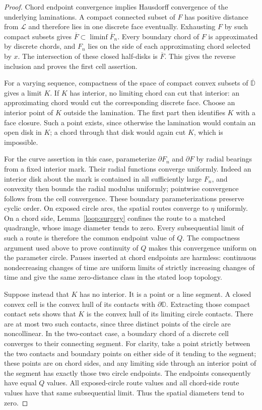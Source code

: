 \documentclass[11pt]{article}
\numberwithin{equation}{section}
\theoremstyle{definition}
\theoremstyle{remark}
\newcommand{\1}{\mathbf 1}
\begin{document}
\begin{proof}
Chord endpoint convergence implies Hausdorff convergence of the underlying
laminations.  A compact connected subset of $F$ has positive distance
from $\mathcal L$ and therefore lies in one discrete face eventually.
Exhausting $F$ by such compact subsets gives
$\overline F\subset\liminf\overline F_n$.  Every boundary chord of $F$
is approximated by discrete chords, and $F_n$ lies on the side of each
approximating chord selected by $x$.  The intersection of these closed
half-disks is $\overline F$.  This gives the reverse inclusion and proves
the first cell assertion.

For a varying sequence, compactness of the space of compact convex
subsets of $\overline{\mathbb D}$ gives a limit $K$.  If $K$ has interior,
no limiting chord can cut that interior: an approximating chord would
cut the corresponding discrete face.  Choose an interior point of $K$
outside the lamination.  The first part then identifies $K$ with a face
closure.  Such a point exists, since otherwise the lamination would
contain an open disk in $K$; a chord through that disk would again cut
$K$, which is impossible.

For the curve assertion in this case, parameterize $\partial F_n$ and
$\partial F$ by radial bearings from a fixed interior mark.  Their radial
functions converge uniformly.  Indeed an interior disk about the mark is
contained in all sufficiently large $F_n$, and convexity then bounds the
radial modulus uniformly; pointwise convergence follows from the cell
convergence.  These boundary parameterizations preserve cyclic order.
On exposed circle arcs, the spatial routes converge to $\eta$ uniformly.
On a chord side, Lemma~\ref{loop:surgery} confines the route to a matched
quadrangle, whose image diameter tends to zero.  Every subsequential
limit of such a route is therefore the common endpoint value of $Q$.
The compactness argument used above to prove continuity of $Q$ makes this
convergence uniform on the parameter circle.  Pauses inserted at chord
endpoints are harmless: continuous nondecreasing changes of time are
uniform limits of strictly increasing changes of time and give the same
zero-distance class in the stated loop topology.

Suppose instead that $K$ has no interior.  It is a point or a line
segment.  A closed convex cell is the convex hull of its contacts with
$\partial\mathbb D$.  Extracting those compact contact sets shows that
$K$ is the convex hull of its limiting circle contacts.  There are at most
two such contacts, since three distinct points of the circle are
noncollinear.  In the two-contact case, a boundary chord of a discrete
cell converges to their connecting segment.  For clarity, take a point
strictly between the two contacts and boundary points on either side of
it tending to the segment; these points are on chord sides, and any
limiting side through an interior point of the segment has exactly those
two circle endpoints.  The endpoints consequently have equal $Q$ values.
All exposed-circle route values and all chord-side route values have that
same subsequential limit.  Thus the spatial diameters tend to zero.


\end{proof}
\end{document}
